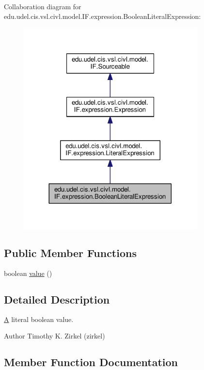 Collaboration diagram for edu.\+udel.\+cis.\+vsl.\+civl.\+model.\+I\+F.\+expression.\+Boolean\+Literal\+Expression\+:
\nopagebreak
\begin{figure}[H]
\begin{center}
\leavevmode
\includegraphics[width=269pt]{interfaceedu_1_1udel_1_1cis_1_1vsl_1_1civl_1_1model_1_1IF_1_1expression_1_1BooleanLiteralExpression__coll__graph}
\end{center}
\end{figure}
\subsection*{Public Member Functions}
\begin{DoxyCompactItemize}
\item 
boolean \hyperlink{interfaceedu_1_1udel_1_1cis_1_1vsl_1_1civl_1_1model_1_1IF_1_1expression_1_1BooleanLiteralExpression_a2b3ff642559f77c162d03c2470ccb9f7}{value} ()
\end{DoxyCompactItemize}


\subsection{Detailed Description}
\hyperlink{structA}{A} literal boolean value. 

\begin{DoxyAuthor}{Author}
Timothy K. Zirkel (zirkel) 
\end{DoxyAuthor}


\subsection{Member Function Documentation}
\hypertarget{interfaceedu_1_1udel_1_1cis_1_1vsl_1_1civl_1_1model_1_1IF_1_1expression_1_1BooleanLiteralExpression_a2b3ff642559f77c162d03c2470ccb9f7}{}
